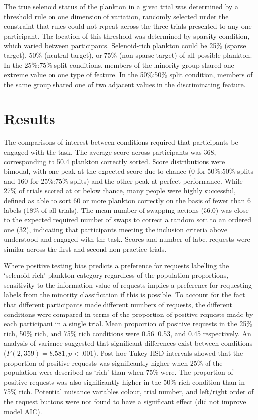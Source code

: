 \documentclass[10pt,letterpaper]{article}
\begin{document}
The true selenoid status of the plankton in a given trial was determined by a threshold rule on one dimension of variation, randomly selected under the constraint that rules could not repeat across the three trials presented to any one participant. The location of this threshold was determined by sparsity condition, which varied between participants. Selenoid-rich plankton could be 25\% (sparse target), 50\% (neutral target), or 75\% (non-sparse target) of all possible plankton. In the 25\%:75\% split conditions, members of the minority group shared one extreme value on one type of feature. In the 50\%:50\% split condition, members of the same group shared one of two adjacent values in the discriminating feature.

\section{Results}
The comparisons of interest between conditions required that participants be engaged with the task. The average score across participants was 368, corresponding to 50.4 plankton correctly sorted. Score distributions were bimodal, with one peak at the expected score due to chance (0 for 50\%:50\% splits and 160 for 25\%:75\% splits) and the other peak at perfect performance. While 27\% of trials scored at or below chance, many people were highly successful, defined as able to sort 60 or more plankton correctly on the basis of fewer than 6 labels (18\% of all trials). The mean number of swapping actions (36.0) was close to the expected required number of swaps to correct a random sort to an ordered one (32), indicating that participants meeting the inclusion criteria above understood and engaged with the task. Scores and number of label requests were similar across the first and second non-practice trials.

Where positive testing bias predicts a preference for requests labelling the `selenoid-rich' plankton category regardless of the population proportions, sensitivity to the information value of requests implies a preference for requesting labels from the minority classification if this is possible. To account for the fact that different participants made different numbers of requests, the different conditions were compared in terms of the proportion of positive requests made by each participant in a single trial.
Mean proportion of positive requests in the 25\% rich, 50\% rich, and 75\% rich conditions were 0.56, 0.53, and 0.45 respectively. An analysis of variance suggested that significant differences exist between conditions ($F(2,359)=8.581, p<.001$). Post-hoc Tukey HSD intervals showed that the proportion of positive requests was significantly higher when 25\% of the population were described as `rich' than when 75\% were. The proportion of positive requests was also significantly higher in the 50\% rich condition than in 75\% rich. Potential nuisance variables colour, trial number, and left/right order of the request buttons were not found to have a significant effect (did not improve model AIC).
\end{document}
